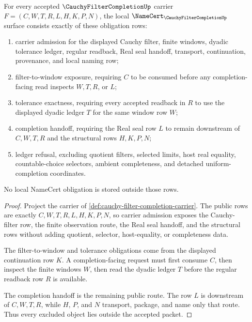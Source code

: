 \begin{theorem}
\label{thm:cauchy-filter-completion-namecert-obligations}
For every accepted $\CauchyFilterCompletionUp$ carrier $F=(C,W,T,R,L,H,K,P,N)$, the local $\NameCert_{\CauchyFilterCompletionUp}$ surface consists exactly of these obligation rows:
\begin{enumerate}
\item carrier admission for the displayed Cauchy filter, finite windows, dyadic tolerance ledger, regular readback, Real seal handoff, transport, continuation, provenance, and local naming row;
\item filter-to-window exposure, requiring $C$ to be consumed before any completion-facing read inspects $W,T,R$, or $L$;
\item tolerance exactness, requiring every accepted readback in $R$ to use the displayed dyadic ledger $T$ for the same window row $W$;
\item completion handoff, requiring the Real seal row $L$ to remain downstream of $C,W,T,R$ and the structural rows $H,K,P,N$;
\item ledger refusal, excluding quotient filters, selected limits, host real equality, countable-choice selectors, ambient completeness, and detached uniform-completion coordinates.
\end{enumerate}
No local NameCert obligation is stored outside those rows.
\end{theorem}
\begin{proof}
Project the carrier of \autoref{def:cauchy-filter-completion-carrier}. The public rows are exactly $C,W,T,R,L,H,K,P,N$, so carrier admission exposes the Cauchy-filter row, the finite observation route, the Real seal handoff, and the structural rows without adding quotient, selector, host-equality, or completeness data.

The filter-to-window and tolerance obligations come from the displayed continuation row $K$. A completion-facing request must first consume $C$, then inspect the finite windows $W$, then read the dyadic ledger $T$ before the regular readback row $R$ is available.

The completion handoff is the remaining public route. The row $L$ is downstream of $C,W,T,R$, while $H$, $P$, and $N$ transport, package, and name only that route. Thus every excluded object lies outside the accepted packet.
\end{proof}

